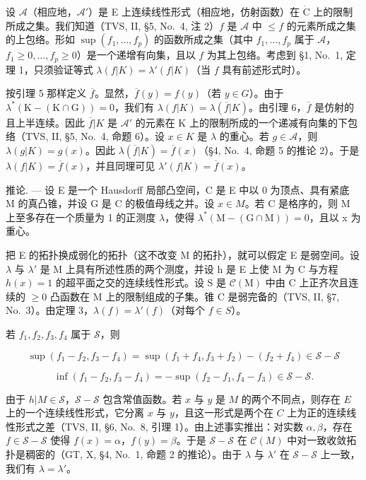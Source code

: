 设 \(\mathcal{A}\)（相应地，\(\mathcal{A}'\)）是 E 上连续线性形式（相应地，仿射函数）在 \(\dot{\mathrm{C}}\) 上的限制所成之集。我们知道（TVS, II, §5, No.~4, 注 2）\(f\) 是 \(\mathcal{A}\) 中 \(\leqslant f\) 的元素所成之集的上包络。形如 \(\sup(f_1, \ldots, f_p)\) 的函数所成之集（其中 \(f_1, \ldots, f_p\) 属于 \(\mathscr{A}\)，\(f_1 \geqslant 0, \ldots, f_p \geqslant 0\)）是一个递增有向集，且以 \(f\) 为其上包络。考虑到 §1, No.~1, 定理 1，只须验证等式 \(\lambda(f|K) = \lambda'(f|K)\)（当 \(f\) 具有前述形式时）。

按引理 5 那样定义 \(\overline{f}\)。显然，\(\overline{f}(y) = f(y)\)（若 \(y \in G\)）。由于 \(\lambda^{*}(\mathrm{K} - (\mathrm{K} \cap \mathrm{G})) = 0\)，我们有 \(\lambda(f|K) = \lambda(\overline{f}|K)\)。由引理 6，\(\overline{f}\) 是仿射的且上半连续。因此 \(\overline{f}|K\) 是 \(\mathcal{A}'\) 的元素在 K 上的限制所成的一个递减有向集的下包络（TVS, II, §5, No.~4, 命题 6）。设 \(x \in K\) 是 \(\lambda\) 的重心。若 \(g \in \mathcal{A}\)，则 \(\lambda(g|K) = g(x)\)。因此 \(\lambda(\overline{f}|K) = \overline{f}(x)\)（§4, No.~4, 命题 5 的推论 2）。于是 \(\lambda(f|K) = \overline{f}(x)\)，并且同理可见 \(\lambda'(f|K) = \overline{f}(x)\)。

推论. --- 设 E 是一个 Hausdorff 局部凸空间，C 是 E 中以 0 为顶点、具有紧底 M 的真凸锥，并设 G 是 C 的极值母线之并。设 \(x \in M\)。若 C 是格序的，则 M 上至多存在一个质量为 1 的正测度 \(\lambda\)，使得 \(\lambda^{*}(\mathrm{M} - (\mathrm{G} \cap \mathrm{M})) = 0\)，且以 x 为重心。

把 E 的拓扑换成弱化的拓扑（这不改变 M 的拓扑），就可以假定 E 是弱空间。设 \(\lambda\) 与 \(\lambda'\) 是 M 上具有所述性质的两个测度，并设 h 是 E 上使 M 为 C 与方程 \(h(x)=1\) 的超平面之交的连续线性形式。设 S 是 \(\mathcal{C}(\mathrm{M})\) 中由 C 上正齐次且连续的 \(\geqslant0\) 凸函数在 M 上的限制组成的子集。锥 C 是弱完备的（TVS, II, §7, No.~3）。由定理 3，\(\lambda(f)=\lambda'(f)\)（对每个 \(f\in S\)）。

若 \(f_{1}, f_{2}, f_{3}, f_{4}\) 属于 \(\mathcal{S}\)，则

\[
\sup \left(f _ {1} - f _ {2}, f _ {3} - f _ {4}\right) = \sup \left(f _ {1} + f _ {4}, f _ {3} + f _ {2}\right) - \left(f _ {2} + f _ {4}\right) \in \mathscr {S} - \mathscr {S}
\]

\[
\inf \left(f _ {1} - f _ {2}, f _ {3} - f _ {4}\right) = - \sup \left(f _ {2} - f _ {1}, f _ {4} - f _ {3}\right) \in \mathscr {S} - \mathscr {S}.
\]

由于 \(h|M \in \mathcal{S}\)，\(\mathcal{S} - \mathcal{S}\) 包含常值函数。若 \(x\) 与 \(y\) 是 \(M\) 的两个不同点，则存在 \(E\) 上的一个连续线性形式，它分离 \(x\) 与 \(y\)，且这一形式是两个在 \(C\) 上为正的连续线性形式之差（TVS, II, §6, No.~8, 引理 1）。由上述事实推出：对实数 \(\alpha, \beta\)，存在 \(f \in \mathcal{S} - \mathcal{S}\) 使得 \(f(x) = \alpha\)，\(f(y) = \beta\)。于是 \(\mathcal{S} - \mathcal{S}\) 在 \(\mathcal{C}(M)\) 中对一致收敛拓扑是稠密的（GT, X, §4, No.~1, 命题 2 的推论）。由于 \(\lambda\) 与 \(\lambda'\) 在 \(\mathcal{S} - \mathcal{S}\) 上一致，我们有 \(\lambda = \lambda'\)。

